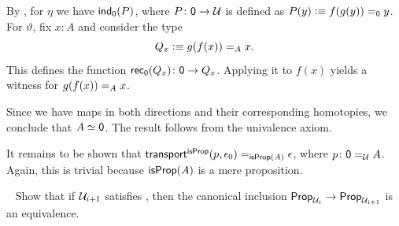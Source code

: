 \begin{solution}
    By , for $\eta$ we have $\mathsf{ind}_{\mathsf{0}}(P)$, where $P\colon\fun0\to\univ$ is defined as $P(y)\mathrel{\vcentcolon}\equiv f(g(y))\mathrel{=_{\mathsf{0}}}y$. For $\vartheta$, fix $x\colon A$ and consider the type
    \[
        Q_x\mathrel{\vcentcolon}\equiv g(f(x))\mathrel{=_{A}}x.
    \]
    This defines the function $\fun{rec}_{\fun0}(Q_x)\colon\fun0\to Q_x$. Applying it to $f(x)$ yields a witness for $g(f(x))\mathrel{=_{A}}x$.

    Since we have maps in both directions and their corresponding homotopies, we conclude that $A\simeq\mathsf{0}$. The result follows from the univalence axiom. \hfill\lqed

    \medskip

    It remains to be shown that $\mathsf{transport}^{\mathsf{isProp}}(p,\epsilon_0)\mathrel{=_{\mathsf{isProp}(A)}}\epsilon$, where $p\colon\fun0\eq\univ A$. Again, this is trivial because $\mathsf{isProp}(A)$ is a mere proposition.
\end{solution}

\begin{exr}\ua\ \fe\label{exr:propositional-resizing}
    Show that if\/ $\mathcal U_{i+1}$ satisfies\/ \Lem, then the canonical inclusion\/ $\mathsf{Prop}_{\mathcal U_i}\to\mathsf{Prop}_{\mathcal U_{i+1}}$ is an equivalence.
\end{exr}

